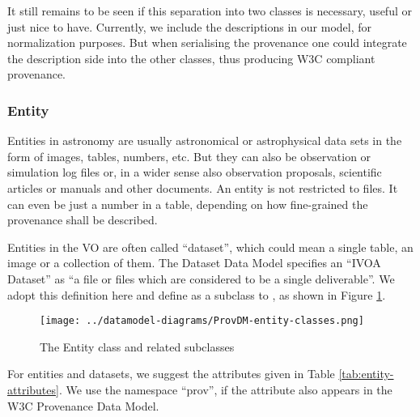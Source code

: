 
It still remains to be seen if this separation into two classes is necessary, 
useful or just nice to have. Currently, we include the descriptions in our model, 
for normalization purposes. But when serialising the provenance one could 
integrate the description side into the other classes, thus producing W3C 
compliant provenance.


\subsubsection{Entity}
Entities in astronomy are usually astronomical or astrophysical data sets in the 
form of images, tables, numbers, etc. But they can also be observation or 
simulation log files or, in a wider sense also observation proposals, scientific 
articles or manuals and other documents. An entity is not restricted to files. 
It can even be just a number in a table, depending on how fine-grained the 
provenance shall be described.

Entities in the VO are often called ``dataset'', which could mean a single 
table, an image or a collection of them. The Dataset Data Model 
\citep{std:DatasetDM} specifies an ``IVOA Dataset'' as ``a file or files which 
are considered to be a single deliverable''. We adopt this definition here and 
define  as a subclass to , as shown in 
Figure \ref{fig:entityclasses}.

\begin{figure}[h]
\centering
\texttt{[image: ../datamodel-diagrams/ProvDM-entity-classes.png]}
\caption{The Entity class and related subclasses}
\label{fig:entityclasses}
\end{figure}

For entities and datasets, we suggest the attributes given in Table 
\ref{tab:entity-attributes}. 
We use the namespace ``prov'', if the attribute also appears in the W3C 
Provenance Data Model.

